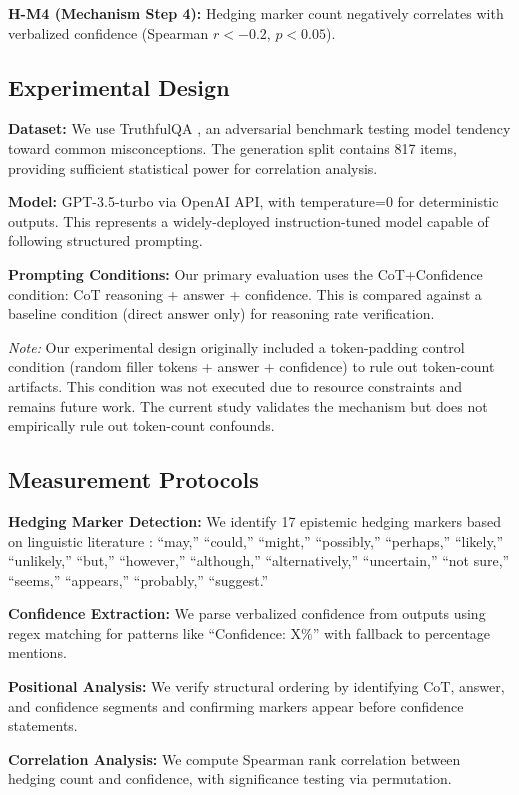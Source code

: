 \textbf{H-M4 (Mechanism Step 4):} Hedging marker count negatively correlates with verbalized confidence (Spearman $r < -0.2$, $p < 0.05$).

\subsection{Experimental Design}

\textbf{Dataset:} We use TruthfulQA \citep{lin2022truthfulqa}, an adversarial benchmark testing model tendency toward common misconceptions. The generation split contains 817 items, providing sufficient statistical power for correlation analysis.

\textbf{Model:} GPT-3.5-turbo via OpenAI API, with temperature=0 for deterministic outputs. This represents a widely-deployed instruction-tuned model capable of following structured prompting.

\textbf{Prompting Conditions:} Our primary evaluation uses the CoT+Confidence condition: CoT reasoning + answer + confidence. This is compared against a baseline condition (direct answer only) for reasoning rate verification.

\emph{Note:} Our experimental design originally included a token-padding control condition (random filler tokens + answer + confidence) to rule out token-count artifacts. This condition was not executed due to resource constraints and remains future work. The current study validates the mechanism but does not empirically rule out token-count confounds.

\subsection{Measurement Protocols}

\textbf{Hedging Marker Detection:} We identify 17 epistemic hedging markers based on linguistic literature \citep{hyland1998hedging}: ``may,'' ``could,'' ``might,'' ``possibly,'' ``perhaps,'' ``likely,'' ``unlikely,'' ``but,'' ``however,'' ``although,'' ``alternatively,'' ``uncertain,'' ``not sure,'' ``seems,'' ``appears,'' ``probably,'' ``suggest.''

\textbf{Confidence Extraction:} We parse verbalized confidence from outputs using regex matching for patterns like ``Confidence: X\%'' with fallback to percentage mentions.

\textbf{Positional Analysis:} We verify structural ordering by identifying CoT, answer, and confidence segments and confirming markers appear before confidence statements.

\textbf{Correlation Analysis:} We compute Spearman rank correlation between hedging count and confidence, with significance testing via permutation.
